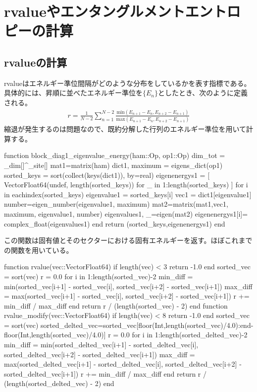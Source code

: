 \documentclass{ltjsarticle}
\begin{document}
\section{rvalueやエンタングルメントエントロピーの計算}
\subsection{rvalueの計算}
rvalueはエネルギー準位間隔がどのような分布をしているかを表す指標である。\\
具体的には、昇順に並べたエネルギー準位を$\lbrace E_n \rbrace$としたとき、次のように定義される。
\begin{align}
  r = \frac{1}{N-2}\sum_{n=1}^{N-2} \frac{\mathrm{min}(E_{n+1}-E_n,E_{n+2}-E_{n+1})}{\mathrm{max}(E_{n+1}-E_n,E_{n+2}-E_{n+1})}
\end{align}
縮退が発生するのは問題なので、既約分解した行列のエネルギー準位を用いて計算する。\\
\begin{jllisting}
function block_diag1_eigenvalue_energy(ham::Op, op1::Op)
  dim_tot = _dim[]^_site[]
  mat1=matrix(ham)
  dict1, maximum = eigens_dict(op1)
  sorted_keys = sort(collect(keys(dict1)), by=real)
  eigenenergys1 = [ Vector{Float64}(undef, length(sorted_keys)) for _ in 1:length(sorted_keys) ]
  for i in eachindex(sorted_keys)
    eigenvalue1 = sorted_keys[i]
    vec1 = dict1[eigenvalue1]
    number=eigen_number(eigenvalue1, maximum)
    mat2=matrix(mat1,vec1, maximum, eigenvalue1, number)
    eigenvalues1, _=eigen(mat2)
    eigenenergys1[i]= complex_float(eigenvalues1)
  end
  return (sorted_keys,eigenenergys1)
end
\end{jllisting}
この関数は固有値とそのセクターにおける固有エネルギーを返す。ほぼこれまでの関数を用いている。\\
\begin{jllisting}
function rvalue(vec::Vector{Float64})
  if length(vec) < 3
    return -1.0
  end
  sorted_vec = sort(vec)
  r = 0.0
  for i in 1:length(sorted_vec)-2
    min_diff = min(sorted_vec[i+1] - sorted_vec[i], sorted_vec[i+2] - sorted_vec[i+1])
    max_diff = max(sorted_vec[i+1] - sorted_vec[i], sorted_vec[i+2] - sorted_vec[i+1])
    r += min_diff / max_diff
  end
  return r / (length(sorted_vec) - 2)
end
function rvalue_modify(vec::Vector{Float64})
  if length(vec) < 8
    return -1.0
  end
  sorted_vec = sort(vec)
  sorted_delted_vec=sorted_vec[floor(Int,length(sorted_vec)/4.0):end-floor(Int,length(sorted_vec)/4.0)]
  r = 0.0
  for i in 1:length(sorted_delted_vec)-2
    min_diff = min(sorted_delted_vec[i+1] - sorted_delted_vec[i], sorted_delted_vec[i+2] - sorted_delted_vec[i+1])
    max_diff = max(sorted_delted_vec[i+1] - sorted_delted_vec[i], sorted_delted_vec[i+2] - sorted_delted_vec[i+1])
    r += min_diff / max_diff
  end
  return r / (length(sorted_delted_vec) - 2)
end
\end{jllisting}
\end{document}
